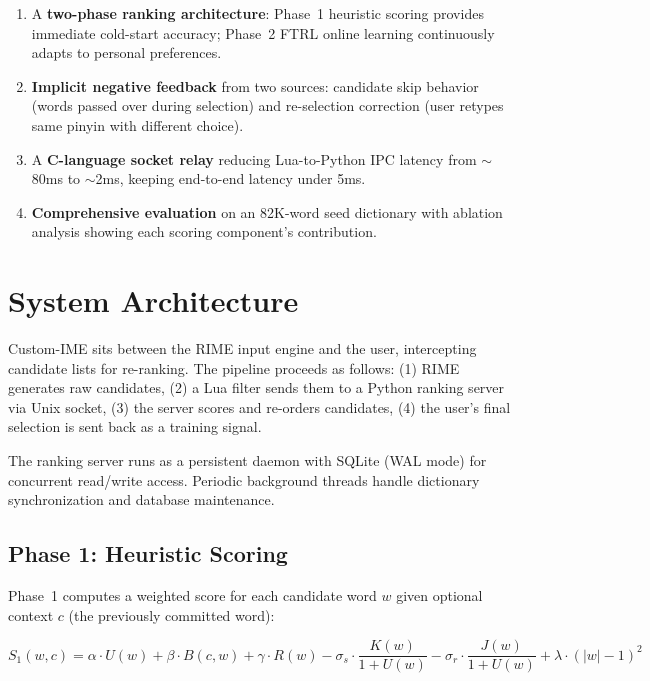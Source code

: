 \documentclass[11pt]{article}
\begin{document}
\begin{enumerate}[nosep]
\item A \textbf{two-phase ranking architecture}: Phase~1 heuristic scoring
  provides immediate cold-start accuracy; Phase~2 FTRL online learning
  continuously adapts to personal preferences.
\item \textbf{Implicit negative feedback} from two sources: candidate skip
  behavior (words passed over during selection) and re-selection correction
  (user retypes same pinyin with different choice).
\item A \textbf{C-language socket relay} reducing Lua-to-Python IPC latency
  from $\sim$80ms to $\sim$2ms, keeping end-to-end latency under 5ms.
\item \textbf{Comprehensive evaluation} on an 82K-word seed dictionary with
  ablation analysis showing each scoring component's contribution.
\end{enumerate}

\section{System Architecture}

Custom-IME sits between the RIME input engine and the user, intercepting
candidate lists for re-ranking. The pipeline proceeds as follows: (1) RIME
generates raw candidates, (2) a Lua filter sends them to a Python ranking
server via Unix socket, (3) the server scores and re-orders candidates,
(4) the user's final selection is sent back as a training signal.

The ranking server runs as a persistent daemon with SQLite (WAL mode) for
concurrent read/write access. Periodic background threads handle dictionary
synchronization and database maintenance.

\subsection{Phase 1: Heuristic Scoring}

Phase~1 computes a weighted score for each candidate word $w$ given optional
context $c$ (the previously committed word):

\begin{equation}\label{eq:p1}
S_1(w, c) = \alpha \cdot U(w) + \beta \cdot B(c, w) + \gamma \cdot R(w)
           - \sigma_s \cdot \frac{K(w)}{1+U(w)}
           - \sigma_r \cdot \frac{J(w)}{1+U(w)}
           + \lambda \cdot (|w|-1)^2
\end{equation}
\end{document}
